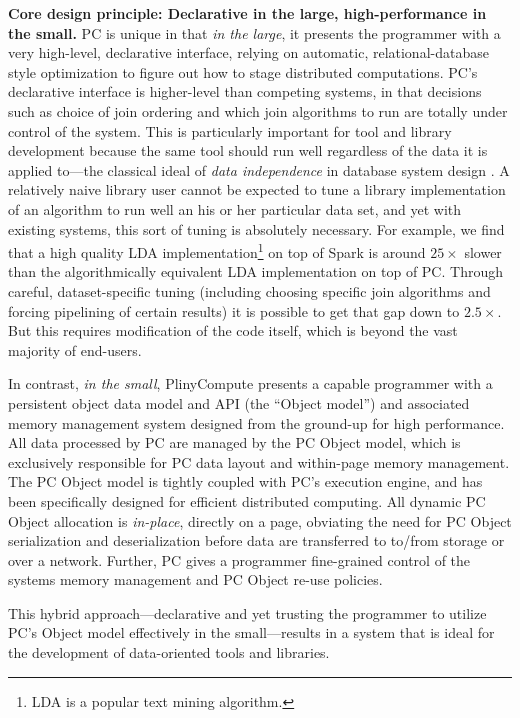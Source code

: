 \vspace{5 pt}
\noindent
\textbf{Core design principle: Declarative in the large, high-performance in the small.}
PC is unique in that \emph{in the large}, 
it presents the programmer with a very high-level,
declarative interface, relying on automatic, 
relational-database style optimization \cite{chaudhuri1998overview} to figure out how to stage
distributed computations.  
PC's declarative interface is higher-level than competing systems, in that decisions such as choice of join ordering and which
join algorithms to run are
totally under control of the system. 
This is particularly important for tool and library development because the same tool should run well regardless of the data
it is applied to---the classical ideal of \emph{data independence} in database system design \cite{stonebraker1990third}.
A relatively naive library user cannot be expected to tune a library implementation of an algorithm to run
well an his or her particular data set, and yet with existing systems, this sort of tuning
is absolutely necessary.  For example, we find
that a high quality LDA implementation\footnote{LDA \cite{blei2003latent} is a popular text mining algorithm.}
on top of Spark is around $25\times$ slower than the algorithmically equivalent LDA
implementation on top of PC.  Through careful, dataset-specific tuning (including choosing specific join algorithms and
forcing pipelining of certain results) it is possible to get that gap down to $2.5\times$.  But this requires modification of the
code itself, which is beyond the vast majority of end-users.

In contrast, \emph{in the small}, PlinyCompute presents a capable programmer with a
persistent object data model and API (the ``Object model'') and associated memory management system
designed from the ground-up for
high performance.
All data processed by PC are managed by
the PC Object
model, which is exclusively responsible for PC data layout and within-page memory management.  
The PC Object model is tightly coupled with
PC's execution engine, and has been specifically designed for efficient distributed computing.  
All dynamic PC Object allocation is \emph{in-place}, directly on a page, obviating
the need for PC Object serialization and deserialization before data are transferred to to/from storage or over a network.
Further, PC gives a programmer fine-grained control of the systems memory management and PC Object re-use policies.

This hybrid approach---declarative and yet trusting the programmer
to utilize PC's Object model effectively
in the small---results in a system that is ideal for the 
development of data-oriented tools and libraries.

